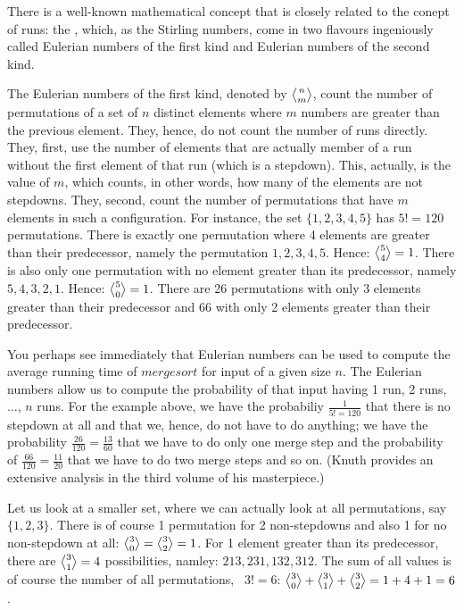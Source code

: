 \documentclass{scrreprt}
\newcommand{\Varid}[1]{\mathit{#1}}
\begin{document}
There is a well-known mathematical concept 
that is closely related to the conept of runs:
the , which, as the Stirling numbers,
come in two flavours ingeniously called 
Eulerian numbers of the first kind and
Eulerian numbers of the second kind.

The Eulerian numbers of the first kind,
denoted by $\eulerianOne{n}{m}$, count
the number of permutations of a set of $n$ 
distinct elements where $m$ numbers are greater
than the previous element.
They, hence, do not count the number of runs
directly. 
They, first, use the number of elements 
that are actually member of a run without the first 
element of that run (which is a stepdown).
This, actually, is the value of $m$,
which counts, in other words, how many of the elements
are not stepdowns.
They, second, count the number of permutations
that have $m$ elements in such a configuration.
For instance, the set $\lbrace 1,2,3,4,5\rbrace$
has $5! = 120$ permutations.
There is exactly one permutation where 4 elements
are greater than their predecessor, namely 
the permutation $1,2,3,4,5$.
Hence: $\eulerianOne{5}{4} = 1$.
There is also only one permutation with no element
greater than its predecessor, namely $5,4,3,2,1$.
Hence: $\eulerianOne{5}{0} = 1$.
There are 26 permutations with only 3 elements
greater than their predecessor
and 66 with only 2 elements greater than their
predecessor.

You perhaps see immediately that Eulerian numbers
can be used to compute the average running time
of \ensuremath{\Varid{mergesort}} for input of a given size $n$.
The Eulerian numbers allow us to compute
the probability of that input having
1 run, 2 runs, $\dots$, $n$ runs.
For the example above, we have the probabiliy
$\frac{1}{5! = 120}$ that there is no stepdown at all
and that we, hence, do not have to do anything;
we have the probability $\frac{26}{120} = \frac{13}{60}$
that we have to do only one merge step and
the probability of $\frac{66}{120} = \frac{11}{20}$
that we have to do two merge steps and so on.
(Knuth provides an extensive analysis 
in the third volume of his masterpiece.)

Let us look at a smaller set, where we can actually
look at all permutations, say $\lbrace 1,2,3\rbrace$.
There is of course 1 permutation for 2 non-stepdowns
and also 1 for no non-stepdown at all: 
$\eulerianOne{3}{0} = \eulerianOne{3}{2} = 1$.
For 1 element greater than its predecessor,
there are $\eulerianOne{3}{1} = 4$ possibilities,
namley: $213, 231, 132, 312$.
The sum of all values is of course the number
of all permutations, \ie\ $3! = 6$:
$\eulerianOne{3}{0} + \eulerianOne{3}{1} + \eulerianOne{3}{2} 
= 1 + 4 + 1 = 6$.
\end{document}
